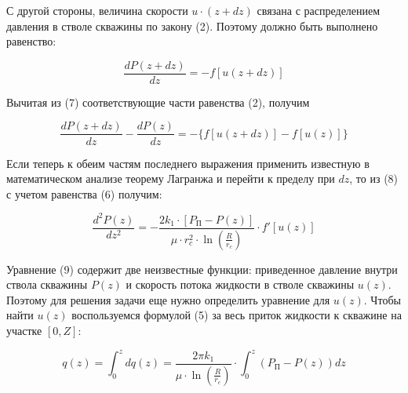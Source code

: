 С другой стороны, величина скорости $u\cdot(z+dz)$ связана с
распределением давления в стволе скважины по закону (2). Поэтому должно
быть выполнено равенство:

\begin{equation}
\frac{dP(z+dz)}{dz}=-f[u(z+dz)]
\end{equation}

Вычитая из (7) соответствующие части равенства (2), получим

\begin{equation}
\frac{dP(z+dz)}{dz}-\frac{dP(z)}{dz}=-\{f[u(z+dz)]-f[u(z)]\}
\end{equation}

Если теперь к обеим частям последнего выражения применить известную в
математическом анализе теорему Лагранжа и перейти к пределу при
$dz$, то из (8) с учетом равенства (6) получим:

\begin{equation}
\frac{d^2P(z)}{dz^2}=-\frac{2k_1\cdot[P_{\text{П}}-P(z)]}{\mu\cdot r_c^2\cdot \ln\left(\frac{R}{r_c}\right)}\cdot f'[u(z)]
\end{equation}

Уравнение (9) содержит две неизвестные функции: приведенное давление
внутри ствола скважины $P(z)$ и скорость потока жидкости в стволе
скважины $u(z)$. Поэтому для решения задачи еще нужно определить
уравнение для $u(z)$. Чтобы найти $u(z)$ воспользуемся
формулой (5) за весь приток жидкости к скважине на участке $[0,Z]$:

\begin{equation}
q(z)=\int_0^z dq(z)=\frac{2\pi k_1}{\mu\cdot\ln\left(\frac{R}{r_c}\right)}\cdot\int_0^z(P_{\text{П}}-P(z))dz
\end{equation}

